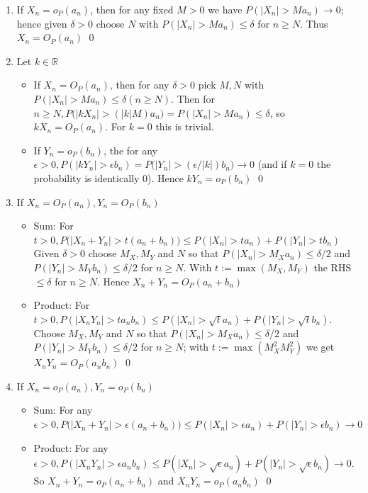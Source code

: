 \documentclass[10pt]{article}
\begin{document}
\begin{enumerate}[label=\textit{(\roman*)}]
    \item If $X_n = o_P(a_n)$, then for any fixed $M > 0$ we have $P(|X_n| > M a_n) \to 0$; hence given $\delta > 0$ choose $N$ with $P(|X_n| > M a_n) \leq \delta$ for $n \geq N$. Thus $X_n = O_P(a_n)$ \qed
    \item Let $k \in \mathbb{R}$
    \begin{itemize}
        \item If $X_n = O_P(a_n)$, then for any $\delta > 0$ pick $M, N$ with $P(|X_n| > M a_n) \leq \delta (n \geq N)$. Then for $n \geq N, P\big(|kX_n| > (|k|M)a_n\big) = P(|X_n|> M a_n) \leq \delta$, so $kX_n = O_P(a_n)$. For $k = 0$ this is trivial.
        \item If $Y_n = o_P(b_n)$, the for any $\epsilon > 0, P(|kY_n| > \epsilon b_n) = P\big(|Y_n| > (\epsilon / |k|) b_n\big) \to 0$ (and if $k = 0$ the probability is identically 0). Hence $kY_n = o_P(b_n)$ \qed
    \end{itemize}
    \newpage
    \item If $X_n = O_P(a_n), Y_n = O_P(b_n)$
    \begin{itemize}
        \item Sum: For $t > 0, P\big(|X_n + Y_n| > t(a_n + b_n)\big) \leq P(|X_n| > t a_n) + P(|Y_n| > t b_n)$ Given $\delta > 0$ choose $M_X, M_Y$ and $N$ so that $P(|X_n| > M_X a_n) \leq \delta / 2$ and $P(|Y_n| > M_Y b_n) \leq \delta / 2$ for $n \geq N$. With $t := \max(M_X, M_Y)$ the RHS $\leq \delta$ for $n \geq N$. Hence $X_n + Y_n = O_P(a_n + b_n)$
        \item Product: For $t > 0, P(|X_nY_n| > t a_nb_n) \leq P(|X_n| > \sqrt{t}a_n) + P(|Y_n| > \sqrt{t}b_n)$. Choose $M_X, M_Y$ and $N$ so that $P(|X_n| > M_X a_n) \leq \delta / 2$ and $P(|Y_n| > M_Y b_n) \leq \delta / 2$ for $n \geq N$; with $t := \max (M_X^2M_Y^2)$ we get $X_nY_n = O_P(a_nb_n)$ \qed
    \end{itemize}
    \item If $X_n = o_P(a_n), Y_n = o_P(b_n)$
    \begin{itemize}
        \item Sum: For any $\epsilon > 0, P\big(|X_n + Y_n| > \epsilon(a_n + b_n)\big) \leq P(|X_n| > \epsilon a_n) + P(|Y_n| > \epsilon b_n) \to 0$
        \item Product: For any $\epsilon > 0, P(|X_nY_n| > \epsilon a_nb_n) \leq P(|X_n| > \sqrt{\epsilon}a_n) + P(|Y_n| > \sqrt{\epsilon}b_n) \to 0$. So $X_n + Y_n = o_P(a_n + b_n)$ and $X_nY_n=o_P(a_nb_n)$ \qed

\end{itemize}
\end{enumerate}
\end{document}
